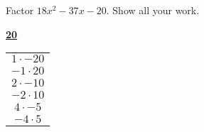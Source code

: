 \documentclass[11pt,letterpaper]{article}
\begin{document}
\newpage





 Factor $18x^2 - 37x - 20$. Show all your work. \pspace

\sol
	\begin{table}[!ht]
	\centering
	\underline{\bfseries 20} \pvspace{0.1cm}
	\begin{tabular}{c}
	$1 \cdot -20$ \\
	$-1 \cdot 20$ \\
	$2 \cdot -10$ \\
	$-2 \cdot 10$ \\
	$4 \cdot -5$ \\
	$-4 \cdot 5$
	\end{tabular}
	\end{table}
\end{document}
